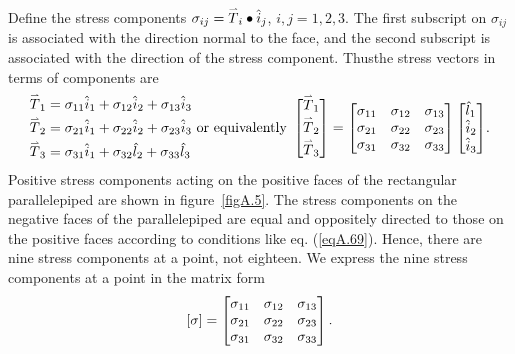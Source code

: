 \documentclass{AeroStructure-ERJohnson}
\def\harp#1{\smash{\mathord{\buildrel{\lower3pt\hbox{$\scriptscriptstyle\rightharpoonup$}}\over{#1}}}}
\begin{document}
Define the stress components $\sigma_{i j}=\harp{T}_{i} \bullet \hat{i}_{j}$, $i, j=1,2,3$. The first subscript on $\sigma_{i j}$ is associated with the direction normal to the face, and the second subscript is associated with the direction of the stress component. Thus\break the stress vectors in terms of components are
\begin{align}\label{eqA.70}
\begin{aligned}
&\harp{T}_{1}=\sigma_{11} \hat{i}_{1}+\sigma_{12} \hat{i}_{2}+\sigma_{13} \hat{i}_{3} \\
&\harp{T}_{2}=\sigma_{21} \hat{i}_{1}+\sigma_{22} \hat{i}_{2}+\sigma_{23} \hat{i}_{3} \\
&\harp{T}_{3}=\sigma_{31} \hat{i}_{1}+\sigma_{32} \hat{l}_{2}+\sigma_{33} \hat{l}_{3}
\end{aligned}\mbox{ or equivalently }
\left[\begin{array}{@{}c@{}}\harp{T}_{1} \\[4pt] \harp{T}_{2} \\[4pt] \harp{T}_{3}\end{array}\right]=\left[\begin{array}{@{}lll@{}}\sigma_{11} & \sigma_{12} & \sigma_{13} \\\sigma_{21} & \sigma_{22} & \sigma_{23} \\\sigma_{31} & \sigma_{32} & \sigma_{33}\end{array}\right]\left[\begin{array}{@{}l@{}}\hat{l}_{1} \\\hat{i}_{2} \\\hat{i}_{3}\end{array}\right]\!.
\end{align}
\noindent Positive stress components acting on the positive faces of the rectangular parallelepiped are shown in figure~\ref{figA.5}. The stress components on the negative faces of the parallelepiped are equal and oppositely directed to those on the positive faces according to conditions like eq. (\ref{eqA.69}). Hence, there are nine stress components at a point, not eighteen. We express the nine stress components at a point in the matrix form%
\begin{align}\label{eqA.71}
[\sigma]=\left[\begin{array}{@{}lll@{}}\sigma_{11} & \sigma_{12} & \sigma_{13} \\\sigma_{21} & \sigma_{22} & \sigma_{23} \\\sigma_{31} & \sigma_{32} & \sigma_{33}\end{array}\right].
\end{align}
\end{document}
